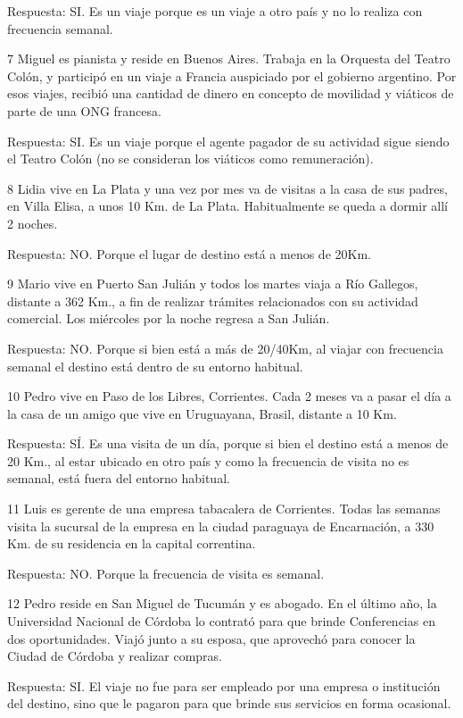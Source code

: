 \documentclass[
  openany]{book}
\begin{document}
Respuesta: SI. Es un viaje porque es un viaje a otro país y no lo realiza con frecuencia semanal.

7 Miguel es pianista y reside en Buenos Aires. Trabaja en la Orquesta del Teatro Colón, y participó en un viaje a Francia auspiciado por el gobierno argentino. Por esos viajes, recibió una cantidad de dinero en concepto de movilidad y viáticos de parte de una ONG francesa.

Respuesta: SI. Es un viaje porque el agente pagador de su actividad sigue siendo el Teatro Colón (no se consideran los viáticos como remuneración).

8 Lidia vive en La Plata y una vez por mes va de visitas a la casa de sus padres, en Villa Elisa, a unos 10 Km. de La Plata. Habitualmente se queda a dormir allí 2 noches.

Respuesta: NO. Porque el lugar de destino está a menos de 20Km.

9 Mario vive en Puerto San Julián y todos los martes viaja a Río Gallegos, distante a 362 Km., a fin de realizar trámites relacionados con su actividad comercial. Los miércoles por la noche regresa a San Julián.

Respuesta: NO. Porque si bien está a más de 20/40Km, al viajar con frecuencia semanal el destino está dentro de su entorno habitual.

10 Pedro vive en Paso de los Libres, Corrientes. Cada 2 meses va a pasar el día a la casa de un amigo que vive en Uruguayana, Brasil, distante a 10 Km.

Respuesta: SÍ. Es una visita de un día, porque si bien el destino está a menos de 20 Km., al estar ubicado en otro país y como la frecuencia de visita no es semanal, está fuera del entorno habitual.

11 Luis es gerente de una empresa tabacalera de Corrientes. Todas las semanas visita la sucursal de la empresa en la ciudad paraguaya de Encarnación, a 330 Km. de su residencia en la capital correntina.

Respuesta: NO. Porque la frecuencia de visita es semanal.

12 Pedro reside en San Miguel de Tucumán y es abogado. En el último año, la Universidad Nacional de Córdoba lo contrató para que brinde Conferencias en dos oportunidades. Viajó junto a su esposa, que aprovechó para conocer la Ciudad de Córdoba y realizar compras.

Respuesta: SI. El viaje no fue para ser empleado por una empresa o institución del destino, sino que le pagaron para que brinde sus servicios en forma ocasional.
\end{document}
